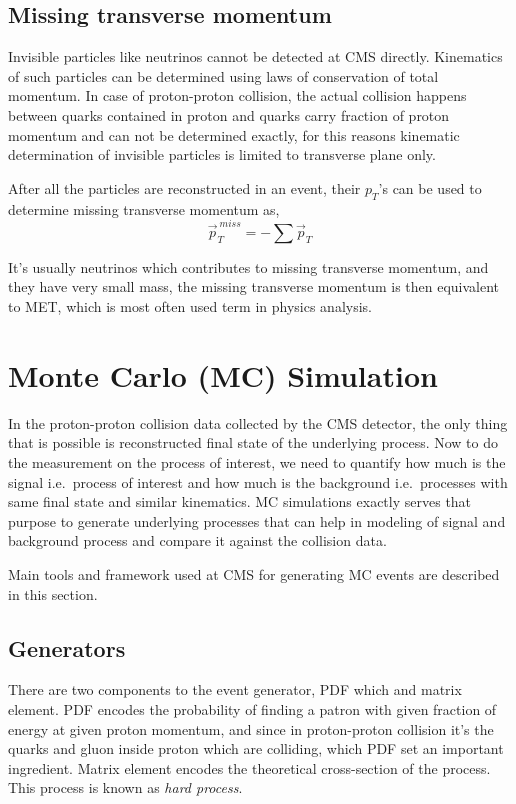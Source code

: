 \subsection{
  Missing transverse momentum
}

Invisible particles like neutrinos cannot be detected at \gls{CMS} directly.
Kinematics of such particles can be determined using laws of conservation of
total momentum. In case of proton-proton collision,
the actual collision happens between quarks contained in
proton and quarks carry fraction of proton momentum
and can not be determined exactly, for this reasons kinematic determination
of invisible particles is limited to transverse plane only.

After all the particles are reconstructed in an event, their \( p_T \)'s
can be used to determine missing transverse momentum as,
%
\begin{equation}
  \vec{p}_{T}^{~miss} = - \sum \vec{p}_{T}
\end{equation}

It's usually neutrinos which contributes to missing transverse momentum,
and they have very small mass, the missing transverse momentum is then
equivalent to \gls{MET}, which is most often used term in physics analysis.

\section{
  Monte Carlo (MC) Simulation
 }

In the proton-proton collision data collected by the \gls{CMS} detector,
the only thing that is possible is reconstructed final state of the underlying
process. Now to do the measurement on the process of interest,
we need to quantify how much is the signal i.e.~process of interest
and how much is the background i.e.~processes with same final state and
similar kinematics. \gls{MC} simulations exactly serves that
purpose to generate underlying processes that can help in
modeling of signal and background process and compare it against the collision
data.

Main tools and framework
used at \gls{CMS} for generating \gls{MC} events
are described in this section.

\subsection{
  Generators
}

There are two components to the event generator,
\gls{PDF} which and matrix element.
\gls{PDF} encodes the probability of finding a patron
with given fraction of energy at given proton momentum,
and since in proton-proton collision it's the quarks and gluon
inside proton which are colliding, which \gls{PDF} set
an important ingredient. Matrix element encodes
the theoretical cross-section of the process. This process
is known as \textit{hard process}.

